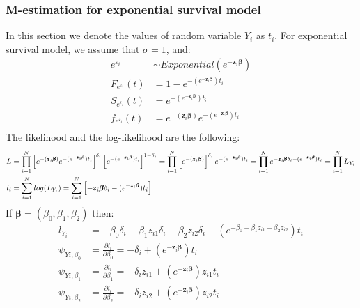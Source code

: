 \documentclass[]{article}
\let\epsilon\varepsilon
\begin{document}
\subsubsection{M-estimation for exponential survival model}
In this section we denote the values of random variable $Y_i$ as $t_i$. For exponential survival model, we assume that $\sigma = 1$, and:
  $$
  \begin{aligned}
    e^{\epsilon_{i}} &\sim Exponential(e^{-\pmb{z}_i \pmb{\beta}})\\
    F_{e^{\epsilon_{i}}}(t) &= 1 - e^{-(e^{-\pmb{z}_i \pmb{\beta}})t_i}\\
    S_{e^{\epsilon_{i}}}(t) &= e^{-(e^{-\pmb{z}_i \pmb{\beta}})t_i}\\
    f_{e^{\epsilon_{i}}}(t) &= e^{-\left(\pmb{z}_i \pmb{\beta}\right)}e^{-(e^{-\pmb{z}_i \pmb{\beta}})t_i}\\
  \end{aligned}
  $$
The likelihood and the log-likelihood are the following:
  $$
  \begin{aligned}
    L &= \prod_{i=1}^N  \left[ e^{-\left(\pmb{z}_i \pmb{\beta}\right)}e^{-(e^{-\pmb{z}_i \pmb{\beta}})t_i} \right]^{\delta_i} \left[e^{-(e^{-\pmb{z}_i \pmb{\beta}})t_i}\right]^{1-\delta_i} =\prod_{i=1}^N   \left[e^{-\left(\pmb{z}_i \pmb{\beta}\right)}\right]^{\delta_i}   e^{-(e^{-\pmb{z}_i \pmb{\beta}})t_i} = \prod_{i=1}^N   e^{-\pmb{z}_i \pmb{\beta}\delta_i-(e^{-\pmb{z}_i \pmb{\beta}})t_i}=\prod_{i=1}^N L_{Y_i}\\
    l_i &=\sum_{i=1}^N log(L_{Y_i}) =\sum_{i=1}^N  \left[  -\pmb{z}_i \pmb{\beta}\delta_i-(e^{-\pmb{z}_i \pmb{\beta}})t_i \right]
  \end{aligned}\\
  $$
If $\pmb{\beta} = (\beta_0, \beta_1, \beta_2)$ then:
  $$
  \begin{aligned}
    l_{Y_i} &=   -\beta_0\delta_i-\beta_1 z_{i1}\delta_i-\beta_2z_{i2}\delta_i-(e^{-\beta_0-\beta_1 z_{i1}-\beta_2z_{i2} })t_i \\
    \psi_{Yi,\beta_0} &= \frac{\partial l_i}{\partial \beta_0} =  -\delta_i+(e^{-\pmb{z}_i \pmb{\beta}})t_i\\
    \psi_{Yi,\beta_1} &= \frac{\partial l_i}{\partial \beta_1} =  -\delta_i z_{i1}+(e^{-\pmb{z}_i \pmb{\beta}})z_{i1}t_i \\
    \psi_{Yi,\beta_2} &= \frac{\partial l_i}{\partial \beta_2} =   -\delta_i z_{i2}+(e^{-\pmb{z}_i \pmb{\beta}})z_{i2}t_i \\
  \end{aligned}
  $$
  
\end{document}

